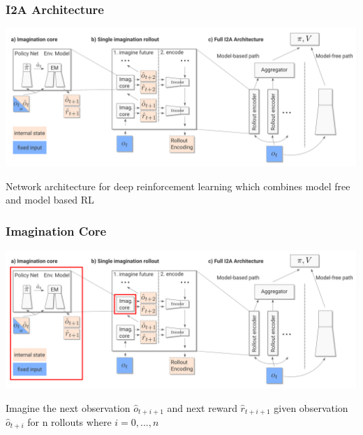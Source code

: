\begin{frame}
    \frametitle{I2A Architecture}


\includegraphics[width=\columnwidth]{./Images/i2a_architecture.png}%

\vspace{-10mm}
Network architecture for deep reinforcement learning which combines model free and model based RL

    
\end{frame}
\clearpage




\begin{frame}
    \frametitle{Imagination Core}

\includegraphics[width=\columnwidth]{./Images/i2a_all_imagination_core.png}%

\vspace{-10mm}
Imagine the next observation $\hat{o}_{t+i+1}$ and next reward $\hat{r}_{t+i+1}$ given observation $\hat{o}_{t+i}$ for n rollouts where $i = 0, ..., n$
\end{frame}
\clearpage



